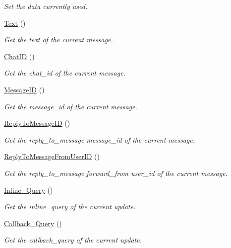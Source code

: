 \begin{DoxyCompactItemize}
\begin{DoxyCompactList}\small\item\em \-Set the data currently used. \end{DoxyCompactList}\item 
\hyperlink{class_telegram_a950a98ae75562dc9c6a458acbd330143}{\-Text} ()
\begin{DoxyCompactList}\small\item\em \-Get the text of the current message. \end{DoxyCompactList}\item 
\hyperlink{class_telegram_a4b624bab3560ed1e761aba1e7431cb6e}{\-Chat\-I\-D} ()
\begin{DoxyCompactList}\small\item\em \-Get the chat\-\_\-id of the current message. \end{DoxyCompactList}\item 
\hyperlink{class_telegram_a957f0d35d7a8cabb6116cc7bf51ceac2}{\-Message\-I\-D} ()
\begin{DoxyCompactList}\small\item\em \-Get the message\-\_\-id of the current message. \end{DoxyCompactList}\item 
\hyperlink{class_telegram_ad4dbc2a3a269f1e596a3d6b40c948ebf}{\-Reply\-To\-Message\-I\-D} ()
\begin{DoxyCompactList}\small\item\em \-Get the reply\-\_\-to\-\_\-message message\-\_\-id of the current message. \end{DoxyCompactList}\item 
\hyperlink{class_telegram_afd21e142f6ae005b8f72b39624da3505}{\-Reply\-To\-Message\-From\-User\-I\-D} ()
\begin{DoxyCompactList}\small\item\em \-Get the reply\-\_\-to\-\_\-message forward\-\_\-from user\-\_\-id of the current message. \end{DoxyCompactList}\item 
\hyperlink{class_telegram_a27937704e98b35ccaf2066aa74b1fbe1}{\-Inline\-\_\-\-Query} ()
\begin{DoxyCompactList}\small\item\em \-Get the inline\-\_\-query of the current update. \end{DoxyCompactList}\item 
\hyperlink{class_telegram_a891f961aa0d3272c01ac9fe64f10a714}{\-Callback\-\_\-\-Query} ()
\begin{DoxyCompactList}\small\item\em \-Get the callback\-\_\-query of the current update. \end{DoxyCompactList}\item 

\end{DoxyCompactItemize}
